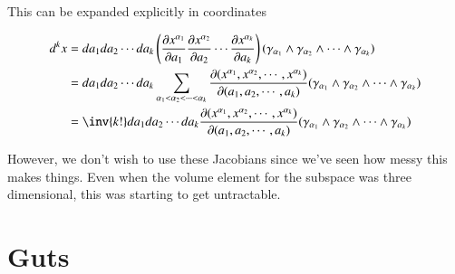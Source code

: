 This can be expanded explicitly in coordinates

\begin{align*}
d^k x 
&= da_1 da_2 \cdots da_k 
\left(
\PD{a_1}{x^{\alpha_1}} 
\PD{a_2}{x^{\alpha_2}} 
\cdots
\PD{a_k}{x^{\alpha_k}} 
\right)
( \gamma_{\alpha_1} \wedge \gamma_{\alpha_2} \wedge \cdots \wedge \gamma_{\alpha_k} ) \\
&= 
da_1 da_2 \cdots da_k 
\sum_{\alpha_1 < \alpha_2 < \cdots < \alpha_k}
\PD{(a_1, a_2, \cdots, a_k)}{(x^{\alpha_1}, x^{\alpha_2}, \cdots, x^{\alpha_k})}
( \gamma_{\alpha_1} \wedge \gamma_{\alpha_2} \wedge \cdots \wedge \gamma_{\alpha_k} ) \\
&= 
\inv{k!}
da_1 da_2 \cdots da_k
\PD{(a_1, a_2, \cdots, a_k)}{(x^{\alpha_1}, x^{\alpha_2}, \cdots, x^{\alpha_k})}
( \gamma_{\alpha_1} \wedge \gamma_{\alpha_2} \wedge \cdots \wedge \gamma_{\alpha_k} ) \\
\end{align*}

However, we don't wish to use these Jacobians since we've seen how messy this makes things.  Even when the volume element for the subspace was three dimensional, this was starting to get untractable.

\section{Guts}

\EndArticle
